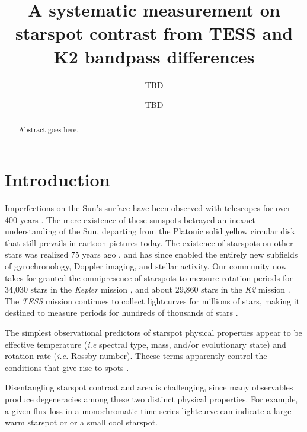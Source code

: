 \documentclass[twocolumn]{aastex631}
\begin{document}
\title{A systematic measurement on starspot contrast from TESS and K2
  bandpass differences}

\author{TBD}

\author{TBD}


\begin{abstract}

  Abstract goes here.

\end{abstract}


\section{Introduction}\label{sec:intro}

Imperfections on the Sun's surface have been observed with telescopes for over 400 years \citep{1613idim.book.....G}.  The mere existence of these sunspots betrayed an inexact understanding of the Sun, departing from the Platonic solid yellow circular disk that still prevails in cartoon pictures today.  The existence of starspots on other stars was realized 75 years ago \citep{1947PASP...59..261K}, and has since enabled the entirely new subfields of gyrochronology, Doppler imaging, and stellar activity.  Our community now takes for granted the omnipresence of starspots to measure rotation periods for 34,030 stars in the \emph{Kepler} mission \citep{2014ApJS..211...24M}, and about 29,860 stars in the \emph{K2} mission \citep{2020A&A...635A..43R}.  The \emph{TESS} mission continues to collect lightcurves for millions of stars, making it destined to measure periods for hundreds of thousands of stars \citep{2022ApJ...927..219C}.

The simplest observational predictors of starspot physical properties appear to be effective temperature (\emph{i.e} spectral type, mass, and/or evolutionary state) and rotation rate (\emph{i.e.} Rossby number).  Theese terms apparently control the conditions that give rise to spots .

Disentangling starspot contrast and area is challenging, since many observables produce degeneracies among these two distinct physical properties.  For example, a given flux loss in a monochromatic time series lightcurve can indicate a large warm starspot or or a small cool starspot.
\end{document}
